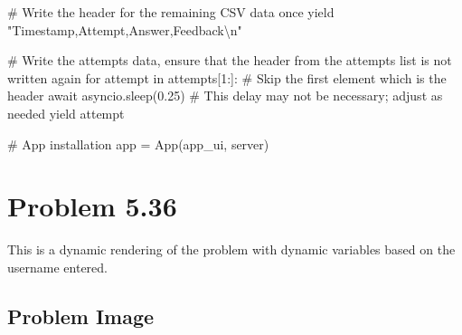 \documentclass[
  letterpaper,
  DIV=11,
  numbers=noendperiod]{scrreprt}
\newenvironment{Shaded}{\begin{snugshade}}{\end{snugshade}}
\newcommand{\NormalTok}[1]{\textcolor[rgb]{0.00,0.23,0.31}{#1}}
\begin{document}
\begin{Shaded}
\begin{Highlighting}[]
\NormalTok{        \# Write the header for the remaining CSV data once}
\NormalTok{        yield "Timestamp,Attempt,Answer,Feedback\textbackslash{}n"}
        
\NormalTok{        \# Write the attempts data, ensure that the header from the attempts list is not written again}
\NormalTok{        for attempt in attempts[1:]:  \# Skip the first element which is the header}
\NormalTok{            await asyncio.sleep(0.25)  \# This delay may not be necessary; adjust as needed}
\NormalTok{            yield attempt}


\NormalTok{\# App installation}
\NormalTok{app = App(app\_ui, server)}
\end{Highlighting}
\end{Shaded}

\chapter*{Problem 5.36}\label{problem-5.36}


This is a dynamic rendering of the problem with dynamic variables based
on the username entered.

\section*{Problem Image}\label{problem-image-34}

\end{document}
